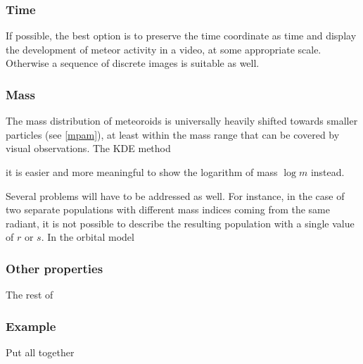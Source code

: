 
        \subsubsection{Time} \label{iovt}
            If possible, the best option is to preserve the time coordinate as time
            and display the development of meteor activity in a video, at some appropriate scale.
            Otherwise a sequence of discrete images is suitable as well.

        \subsubsection{Mass} \label{iovm}
            The mass distribution of meteoroids is universally heavily shifted
            towards smaller particles (see \cref{mpam}), at least within the mass
            range that can be covered by visual observations.
            The KDE method

            it is easier and more meaningful to show the logarithm of mass $\log m$ instead.

            Several problems will have to be addressed as well.
            For instance, in the case of two separate populations with different mass indices
            coming from the same radiant, it is not possible to describe the resulting
            population with a single value of $r$ or $s$. In the orbital model

        \subsubsection{Other properties} \label{iovo}
           The rest of 

        \subsubsection{Example} \label{iove}
            Put all together



